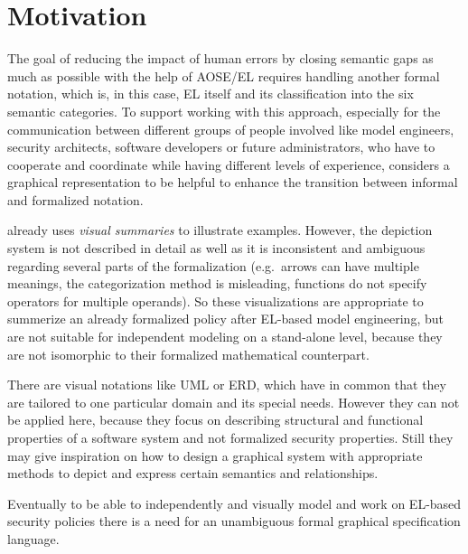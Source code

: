 \documentclass[twoside, openright, 12pt]{book}
\begin{document}
\section{Motivation} 
The goal of reducing the impact of human errors by closing semantic gaps as much as possible with the help of AOSE/EL requires handling another formal notation, which is, in this case, EL itself and its classification into the six semantic categories.
To support working with this approach, especially for the communication between different groups of people involved like model engineers, security architects, software developers or future administrators, who have to cooperate and coordinate while having different levels of experience, \citet*{Amthor18} considers a graphical representation to be helpful to enhance the transition between informal and formalized notation.

\citet*{Amthor18} already uses \textit{visual summaries} to illustrate examples.
However, the depiction system is not described in detail as well as it is inconsistent and ambiguous regarding several parts of the formalization (e.g.\ arrows can have multiple meanings, the categorization method is misleading, functions do not specify operators for multiple operands).
So these visualizations are appropriate to summerize an already formalized policy after EL-based model engineering, but are not suitable for independent modeling on a stand-alone level, because they are not isomorphic to their formalized mathematical counterpart.


There are visual notations like UML or ERD, which have in common that they are tailored to one particular domain and its special needs.
However they can not be applied here, because they focus on describing structural and functional properties of a software system and not formalized security properties.
Still they may give inspiration on how to design a graphical system with appropriate methods to depict and express certain semantics and relationships.

Eventually to be able to independently and visually model and work on EL-based security policies there is a need for an unambiguous formal graphical specification language.
\end{document}
